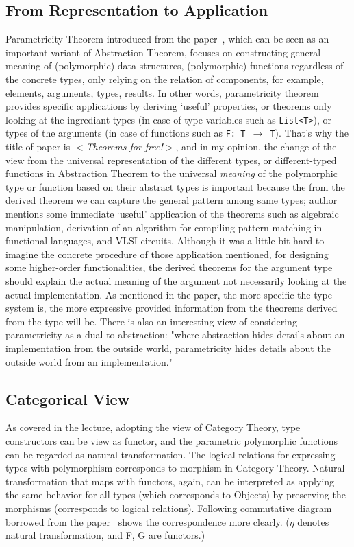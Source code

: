 \documentclass[sigconf]{acmart}
\begin{document}
\subsection{From Representation to Application}

Parametricity Theorem introduced from the paper~\cite{theoremsforfree}, which can be seen as an important variant of Abstraction Theorem, focuses on constructing general meaning of (polymorphic) data structures, (polymorphic) functions regardless of the concrete types, only relying on the relation of components, for example, elements, arguments, types, results. In other words, parametricity theorem provides specific applications by deriving `useful' properties, or theorems only looking at the ingrediant types (in case of type variables such as \texttt{List<T>}), or types of the arguments (in case of functions such as \texttt{F: T $\rightarrow$ T}). That's why the title of paper is \textit{$<$Theorems for free!$>$}, and in my opinion, the change of the view from the universal representation of the different types, or different-typed functions in Abstraction Theorem to the universal \textit{meaning} of the polymorphic type or function based on their abstract types is important because the from the derived theorem we can capture the general pattern among same types; author mentions some immediate `useful' application of the theorems such as algebraic manipulation, derivation of an algorithm for compiling pattern matching in functional languages, and VLSI circuits. Although it was a little bit hard to imagine the concrete procedure of those application mentioned, for designing some higher-order functionalities, the derived theorems for the argument type should explain the actual meaning of the argument not necessarily looking at the actual implementation. As mentioned in the paper, the more specific the type system is, the more expressive provided information from the theorems derived from the type will be. There is also an interesting view of considering parametricity as a dual to abstraction: "where abstraction hides details about an implementation from the outside world, parametricity hides details about the outside world from an implementation."~\cite{parametricitylecture}


\subsection{Categorical View}
As covered in the lecture, adopting the view of Category Theory, type constructors can be view as functor, and the parametric polymorphic functions can be regarded as natural transformation. The logical relations for expressing types with polymorphism corresponds to morphism in Category Theory. Natural transformation that maps with functors, again, can be interpreted as applying the same behavior for all types (which corresponds to Objects) by preserving the morphisms (corresponds to logical relations). Following commutative diagram borrowed from the paper~\cite{2013dedicate} shows the correspondence more clearly. ($\eta$ denotes natural transformation, and F, G are functors.)
\end{document}
